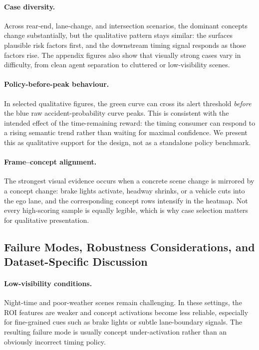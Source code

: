 \paragraph{Case diversity.}
Across rear-end, lane-change, and intersection scenarios, the dominant
concepts change substantially, but the qualitative pattern stays similar: the
\cbm{} surfaces plausible risk factors first, and the downstream timing signal
responds as those factors rise. The appendix figures also show that visually
strong cases vary in difficulty, from clean agent separation to cluttered or
low-visibility scenes.

\paragraph{Policy-before-peak behaviour.}
In selected qualitative figures, the green \caac{} curve can cross its alert
threshold \emph{before} the blue raw accident-probability curve peaks. This is
consistent with the intended effect of the time-remaining reward: the timing
consumer can respond to a rising semantic trend rather than waiting for maximal
confidence. We present this as qualitative support for the design, not as a
standalone policy benchmark.

\paragraph{Frame--concept alignment.}
The strongest visual evidence occurs when a concrete scene change is mirrored
by a concept change: brake lights activate, headway shrinks, or a vehicle cuts
into the ego lane, and the corresponding concept rows intensify in the
heatmap. Not every high-scoring sample is equally legible, which is why case
selection matters for qualitative presentation.

\subsection{Failure Modes, Robustness Considerations, and Dataset-Specific Discussion}
\label{app:failure}

\paragraph{Low-visibility conditions.}
Night-time and poor-weather scenes remain challenging. In these settings, the
ROI features are weaker and concept activations become less reliable,
especially for fine-grained cues such as brake lights or subtle lane-boundary
signals. The resulting failure mode is usually concept under-activation rather
than an obviously incorrect timing policy.

